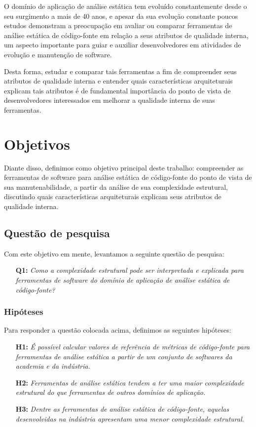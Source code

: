 
O domínio de aplicação de análise estática tem evoluído constantemente desde o
seu surgimento a mais de 40 anos, e apesar da sua evolução constante poucos
estudos demonstram a preocupação em avaliar ou comparar ferramentas de análise
estática de código-fonte em relação a seus atributos de qualidade interna, um
aspecto importante para guiar e auxiliar desenvolvedores em atividades de
evolução e manutenção de software.

Desta forma, estudar e comparar tais ferramentas a fim de compreender seus
atributos de qualidade interna e entender quais características arquiteturais
explicam tais atributos é de fundamental importância do ponto de vista de
desenvolvedores interessados em melhorar a qualidade interna de suas
ferramentas.

\section{Objetivos}

Diante disso, definimos como objetivo principal deste trabalho: compreender
as ferramentas de software para análise estática de código-fonte do ponto de
vista de sua manutenabilidade, a partir da análise de sua complexidade
estrutural, discutindo quais características arquiteturais explicam seus
atributos de qualidade interna.

\subsection{Questão de pesquisa}

Com este objetivo em mente, levantamos a seguinte questão de pesquisa:

\begin{enumerate}
  \item [{\bf Q1:}] {\em Como a complexidade estrutural pode ser interpretada
    e explicada para ferramentas de software do domínio de aplicação de
    análise estática de código-fonte?}
\end{enumerate}

\subsubsection{Hipóteses}

Para responder a questão colocada acima, definimos as seguintes hipóteses:

\begin{enumerate}
  \item[{\bf H1:}] {\em É possível calcular valores de referência de métricas
    de código-fonte para ferramentas de análise estática a partir de um
    conjunto de softwares da academia e da indústria.}
  \item[{\bf H2:}] {\em Ferramentas de análise estática tendem a ter uma
    maior complexidade estrutural do que ferramentas de outros domínios de
    aplicação.}
  \item[{\bf H3:}] {\em Dentre as ferramentas de análise estática de
    código-fonte, aquelas desenvolvidas na indústria apresentam uma menor
    complexidade estrutural.}
\end{enumerate}

